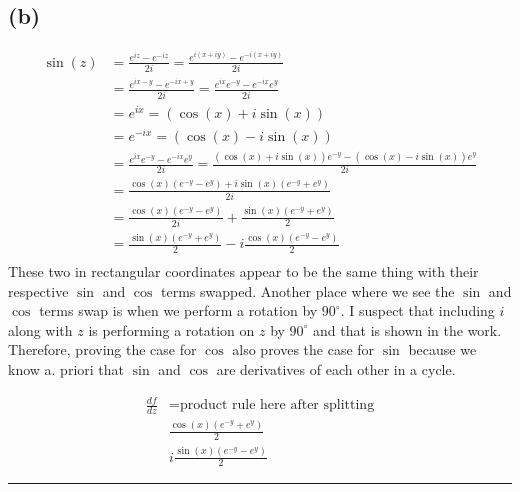 \documentclass{article}
\newcommand{\der}[2]{\frac{d#1}{d#2}}
\begin{document}
\subsection*{(b)}
\begin{align*}
  \sin{(z)} &= \frac{e^{iz} - e^{-iz}}{2i}  = \frac{e^{i(x+iy)} - e^{-i(x+iy)}}{2i} \\
          &= \frac{e^{ix-y} - e^{-ix+y}}{2i} = \frac{e^{ix}e^{-y} - e^{-ix}e^{y}}{2i} \\
          &= e^{ix} = (\cos{(x)} + i\sin{(x)}) \\
          &= e^{-ix} = (\cos{(x)} - i\sin{(x)}) \\
          &= \frac{e^{ix}e^{-y} - e^{-ix}e^{y}}{2i} = \frac{(\cos{(x)} + i\sin{(x)})e^{-y} - (\cos{(x)} - i\sin{(x)})e^{y}}{2i} \\
  &= \frac{\cos{(x)}(e^{-y} - e^{y}) + i\sin{(x)}(e^{-y}+ e^{y})}{2i} \\
            &= \frac{\cos{(x)}(e^{-y} - e^{y})}{2i} + \frac{\sin{(x)}(e^{-y}+ e^{y})}{2} \\
  &=  \frac{\sin{(x)}(e^{-y}+ e^{y})}{2} -i\frac{\cos{(x)}(e^{-y} - e^{y})}{2} \\
\end{align*}
These two in rectangular coordinates appear to be the same thing with their respective $\sin$ and $\cos$ terms swapped. Another place where we see the $\sin$ and $\cos$ terms swap is when we perform a rotation by $90^\circ$. I suspect that including $i$ along with $z$ is performing a rotation on $z$ by $90^\circ$ and that is shown in the work. Therefore, proving the case for $\cos$ also proves the case for $\sin$ because we know a. priori that $\sin$ and $\cos$ are derivatives of each other in a cycle.

\begin{align*}
  \der{f}{z} &= \text{product rule here after splitting}\\
  & \frac{\cos{(x)}(e^{-y} + e^{y})}{2}\\
  & i\frac{\sin{(x)}(e^{-y}- e^{y})}{2}
\end{align*}
\vspace{.5cm} %

\hrule

\end{document}
